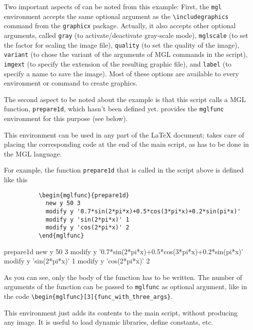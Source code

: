\documentclass{article}
\begin{document}
\begin{description}
		Two important aspects of \mglTeX{} can be noted from this example: First, the \verb|mgl| environment accepts the same optional argument as the \verb|\includegraphics| command from the \verb|graphicx| package. Actually, it also accepts other optional arguments, called \verb|gray| (to activate/deactivate gray-scale mode), \verb|mglscale| (to set the factor for scaling the image file), \verb|quality| (to set the quality of the image), \verb|variant| (to chose the variant of the arguments of MGL commands in the script), \verb|imgext| (to specify the extension of the resulting graphic file), and \verb|label| (to specify a name to save the image). Most of these options are available to every \mglTeX{} environment or command to create graphics.
		
		The second aspect to be noted about the example is that this script calls a MGL function, \verb|prepare1d|, which hasn't been defined yet. \mglTeX{} provides the \verb|mglfunc| environment for this purpose (see below).
		
		\item[mglfunc] This environment can be used in any part of the \LaTeX{} document; \mglTeX{} takes care of placing the corresponding code at the end of the main script, as has to be done in the MGL language.
		
		For example, the function \verb|prepare1d| that is called in the script above is defined like this
		\begin{verbatim}
		  \begin{mglfunc}{prepare1d}
		    new y 50 3
		    modify y '0.7*sin(2*pi*x)+0.5*cos(3*pi*x)+0.2*sin(pi*x)'
		    modify y 'sin(2*pi*x)' 1
		    modify y 'cos(2*pi*x)' 2
		  \end{mglfunc}
		\end{verbatim}
		\begin{mglfunc}{prepare1d}
			new y 50 3
			modify y '0.7*sin(2*pi*x)+0.5*cos(3*pi*x)+0.2*sin(pi*x)'
			modify y 'sin(2*pi*x)' 1
			modify y 'cos(2*pi*x)' 2
		\end{mglfunc}
		As you can see, only the body of the function has to be written. The number of arguments of the function can be passed to \verb|mglfunc| as optional argument, like in the code \verb|\begin{mglfunc}[3]{func_with_three_args}|.
		
		\item[mgladdon] This environment just adds its contents to the main script, without producing any image. It is useful to load dynamic libraries, define constants, etc.
		

\end{description}
\end{document}
